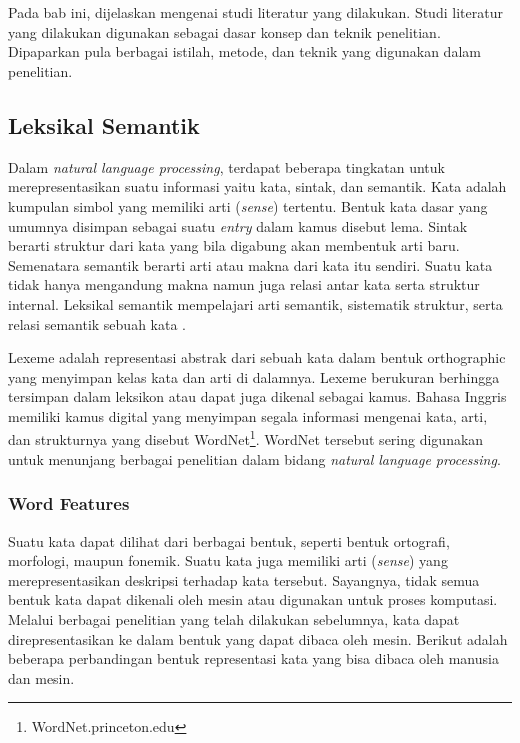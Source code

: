 \chapter{\babDua}
Pada bab ini, dijelaskan mengenai studi literatur yang dilakukan. Studi literatur yang dilakukan digunakan sebagai dasar konsep dan teknik penelitian. Dipaparkan pula berbagai istilah, metode, dan teknik yang digunakan dalam penelitian.

%
\section{Leksikal Semantik}
Dalam \textit{natural language processing}, terdapat beberapa tingkatan untuk merepresentasikan suatu informasi yaitu kata, sintak, dan semantik. Kata adalah kumpulan simbol yang memiliki arti (\textit{sense}) tertentu. Bentuk kata dasar yang umumnya disimpan sebagai suatu \textit{entry} dalam kamus disebut lema. Sintak berarti struktur dari kata yang bila digabung akan membentuk arti baru. Semenatara semantik berarti arti atau makna dari kata itu sendiri. Suatu kata tidak hanya mengandung makna namun juga relasi antar kata serta struktur internal. Leksikal semantik mempelajari arti semantik, sistematik struktur, serta relasi semantik sebuah kata \citep{jurafsky2000speech}. %

Lexeme adalah representasi abstrak dari sebuah kata dalam bentuk orthographic yang menyimpan kelas kata dan arti di dalamnya. Lexeme berukuran berhingga tersimpan dalam leksikon atau dapat juga dikenal sebagai kamus. Bahasa Inggris memiliki kamus digital yang menyimpan segala informasi mengenai kata, arti, dan strukturnya yang disebut WordNet\footnote{WordNet.princeton.edu}. WordNet tersebut sering digunakan untuk menunjang berbagai penelitian dalam bidang \textit{natural language processing}. 

\subsection{Word Features}
Suatu kata dapat dilihat dari berbagai bentuk, seperti bentuk ortografi, morfologi, maupun fonemik. Suatu kata juga memiliki arti (\textit{sense}) yang merepresentasikan deskripsi terhadap kata tersebut. Sayangnya, tidak semua bentuk kata dapat dikenali oleh mesin atau digunakan untuk proses komputasi. Melalui berbagai penelitian yang telah dilakukan sebelumnya, kata dapat direpresentasikan ke dalam bentuk yang dapat dibaca oleh mesin. Berikut adalah beberapa perbandingan bentuk representasi kata yang bisa dibaca oleh manusia dan mesin.

